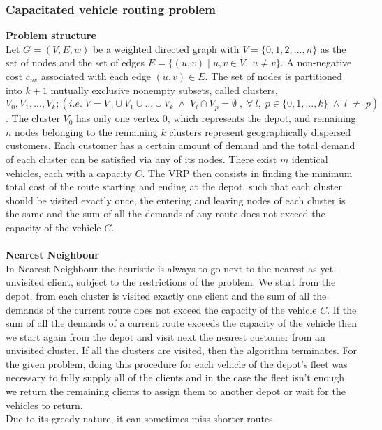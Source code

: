 \documentclass{article}
\begin{document}
\subsubsection{Capacitated vehicle routing problem}
\textbf{Problem structure}\\
Let $G=(V, E,w)$ be a weighted directed graph with $V=\{0, 1, 2, ..., n\}$ as the set of nodes and the set of edges $E=\{(u, v)\; | \;u,v \in V,\;u\neq v\}$. A non-negative cost $c_{uv}$ associated with each edge $(u, v) \in E$.
The set of nodes is partitioned into $k+1$ mutually exclusive nonempty subsets, called
clusters, $V_0, V_1, ..., V_k;(i.e.\;V = V_0 \cup V_1 \cup ... \cup V_k\;\wedge\;V_l \cap V_p = \emptyset \;,\; \forall\:l,\;p\in\{0, 1, ..., k\}\;\wedge\;l\;\neq\;p)$. The cluster $V_0$ has only one vertex 0, which represents the depot, and remaining $n$
nodes belonging to the remaining $k$ clusters represent geographically dispersed customers. Each
customer has a certain amount of demand and the total demand of each cluster can be satisfied
via any of its nodes. There exist $m$ identical vehicles, each with a capacity $C$. The VRP then consists in finding the minimum total cost of the route starting and ending at the depot, such that each cluster should be visited exactly once, the entering and leaving nodes of each cluster is the same and the sum of all the demands of any route does not exceed the capacity of the vehicle $C$.\\\\
\textbf{Nearest Neighbour}\\
In Nearest Neighbour the heuristic is always to go next to the nearest as-yet-unvisited client, subject to the restrictions of the problem. We start from the depot, from each cluster is visited exactly one client and the sum of all the demands of the current route does not exceed the capacity of the vehicle $C$. If the sum of all the demands of a current route exceeds the capacity of the vehicle then we start again from the depot and visit next the nearest customer from an unvisited cluster. If all the clusters are visited, then the algorithm terminates. For the given problem, doing this procedure for each vehicle of the depot's fleet was necessary to fully supply all of the clients and in the case the fleet isn't enough we return the remaining clients to assign them to another depot or wait for the vehicles to return.\\ Due to its greedy nature, it can sometimes miss shorter routes.\\\\
\end{document}
